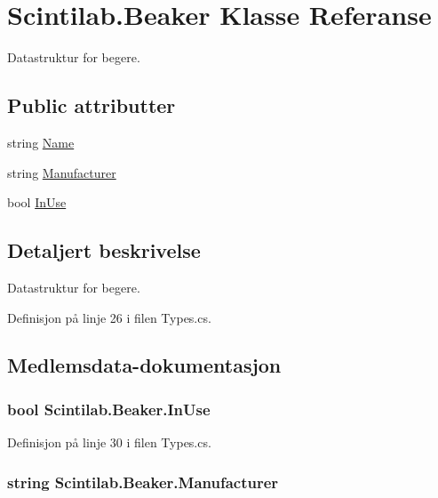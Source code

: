 \hypertarget{class_scintilab_1_1_beaker}{\section{Scintilab.\+Beaker Klasse Referanse}
\label{class_scintilab_1_1_beaker}
}


Datastruktur for begere.  


\subsection*{Public attributter}
\begin{DoxyCompactItemize}
\item 
string \hyperlink{class_scintilab_1_1_beaker_acb97eb3b7c1a9448162a6f526152713c}{Name}
\item 
string \hyperlink{class_scintilab_1_1_beaker_a54c85016c0711130d2b977db5004d694}{Manufacturer}
\item 
bool \hyperlink{class_scintilab_1_1_beaker_a5e26e17ccd65399bba732ebb21050f94}{In\+Use}
\end{DoxyCompactItemize}


\subsection{Detaljert beskrivelse}
Datastruktur for begere. 

Definisjon på linje 26 i filen Types.\+cs.



\subsection{Medlemsdata-\/dokumentasjon}
\hypertarget{class_scintilab_1_1_beaker_a5e26e17ccd65399bba732ebb21050f94}{
\subsubsection[{In\+Use}]{\setlength{\rightskip}{0pt plus 5cm}bool Scintilab.\+Beaker.\+In\+Use}}\label{class_scintilab_1_1_beaker_a5e26e17ccd65399bba732ebb21050f94}


Definisjon på linje 30 i filen Types.\+cs.

\hypertarget{class_scintilab_1_1_beaker_a54c85016c0711130d2b977db5004d694}{
\subsubsection[{Manufacturer}]{\setlength{\rightskip}{0pt plus 5cm}string Scintilab.\+Beaker.\+Manufacturer}}\label{class_scintilab_1_1_beaker_a54c85016c0711130d2b977db5004d694}



